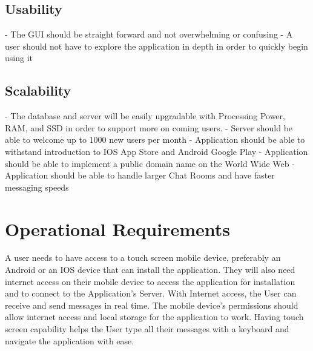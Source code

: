 \documentclass[11pt]{article}
\theoremstyle{plain}
\theoremstyle{definition}
\begin{document}
\subsection{Usability}
- The GUI should be straight forward and not overwhelming or confusing  \newline
- A user should not have to explore the application in depth in order to quickly begin using it  \newline

\subsection{Scalability}
- The database and server will be easily upgradable with Processing Power, RAM, and SSD in order to support more on coming users.   \newline
- Server should be able to welcome up to 1000 new users per month \newline
- Application should be able to withstand introduction to IOS App Store and Android Google Play \newline
- Application should be able to implement a public domain name on the World Wide Web \newline
- Application should be able to handle larger Chat Rooms and have faster messaging speeds \newline


\section{Operational Requirements}\label{sec:operationalrequirements}
A user needs to have access to a touch screen mobile device, preferably an Android or an IOS device that can install the application. They will also need  internet access on their mobile device to access the application for installation and to connect to the Application's Server. With Internet access, the User can receive and send messages in real time. The mobile device’s permissions should allow internet access and local storage for the application to work. Having touch screen capability helps the User type all their messages with a keyboard and navigate the application with ease.
\end{document}

